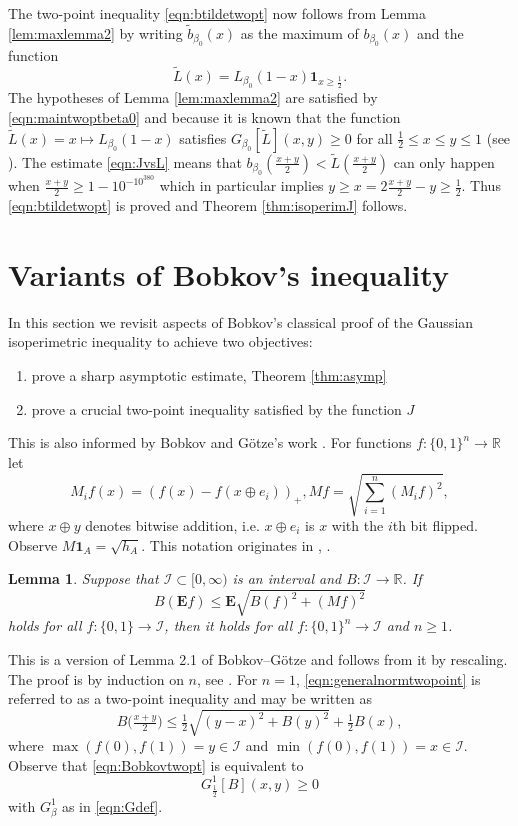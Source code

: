 \documentclass[12pt]{amsart}
\theoremstyle{plain}
\newtheorem{lem}[thm]{Lemma}
\theoremstyle{definition}
\theoremstyle{remark}
\numberwithin{equation}{section}
\begin{document}
The two-point inequality \eqref{eqn:btildetwopt} now follows from Lemma \ref{lem:maxlemma2} by writing $\tilde{b}_{\beta_0}(x)$ as the maximum of $b_{\beta_0}(x)$ and the function 
\[\tilde{L}(x)=L_{\beta_0}(1-x)\mathbf{1}_{x\ge \frac12}.\]
The hypotheses of Lemma \ref{lem:maxlemma2} are satisfied by \eqref{eqn:maintwoptbeta0} and because it is known that the function $\tilde{L}(x)=x\mapsto L_{\beta_0}(1-x)$ satisfies $G_{\beta_0}[\tilde{L}](x,y)\ge 0$ for all $\frac12\le x\le y\le 1$ (see \cite[Lemma 2.3]{BIM23}). The estimate \eqref{eqn:JvsL} means that $b_{\beta_0}(\tfrac{x+y}{2})<\tilde{L}(\tfrac{x+y}{2})$ can only happen when $\frac{x+y}2\ge 1-10^{-10^{380}}$ which in particular implies $y\ge x=2 \tfrac{x+y}{2}-y\ge\frac12$. Thus \eqref{eqn:btildetwopt} is proved and Theorem \ref{thm:isoperimJ} follows.

\section{Variants of Bobkov's inequality}\label{sec:bobkov}

In this section we revisit aspects of Bobkov's classical proof \cite{Bob97} of the Gaussian isoperimetric inequality to achieve two objectives: 
\begin{enumerate}
\item prove a sharp asymptotic estimate, Theorem \ref{thm:asymp}
\item prove a crucial two-point inequality satisfied by the function $J$
\end{enumerate}
This is also informed by Bobkov and G\"otze's work \cite{BG99}.
For functions $f:\{0,1\}^n\to \mathbb{R}$ let
\[  M_i f(x) = (f(x)-f(x\oplus e_i))_+, M f = \sqrt{\sum_{i=1}^n (M_i f)^2}, \]
where $x\oplus y$ denotes bitwise addition, i.e. $x\oplus e_i$ is $x$ with the $i$th bit flipped.
Observe $M \mathbf{1}_A = \sqrt{h_A}$. This notation originates in \cite{Tal93}, \cite{BG99}.
\begin{lem}\label{prop:generaltwopointinduction}
Suppose that $\mathcal{I}\subset [0,\infty)$ is an interval and $B:\mathcal{I}\to \mathbb{R}$. If
\begin{equation}\label{eqn:generalnormtwopoint}
B(\mathbf{E} f) \le \mathbf{E} \sqrt{B(f)^2 + (Mf)^2}
\end{equation}
holds for all $f:\{0,1\}\to \mathcal{I}$, then it holds for all $f:\{0,1\}^n\to \mathcal{I}$ and $n\ge 1$.
\end{lem}
This is a version of Lemma 2.1 of Bobkov--G\"otze \cite{BG99} and follows from it by rescaling. The proof is by induction on $n$, see \cite[Lemma 1]{Bob97}. For $n=1$, \eqref{eqn:generalnormtwopoint} is referred to as a two-point inequality and may be written as
\begin{equation}\label{eqn:Bobkovtwopt}
B\Big(\tfrac{x+y}{2}\Big) \le \tfrac12 \sqrt{(y-x)^2 + B(y)^2} + \tfrac12 B(x),
\end{equation}
where $\max(f(0),f(1))=y\in\mathcal{I}$ and $\min(f(0),f(1))=x\in\mathcal{I}$. Observe that \eqref{eqn:Bobkovtwopt} is equivalent to 
\[G^1_{\frac12}[B](x,y)\ge 0\]
with $G^1_\beta$ as in \eqref{eqn:Gdef}.
\end{document}
